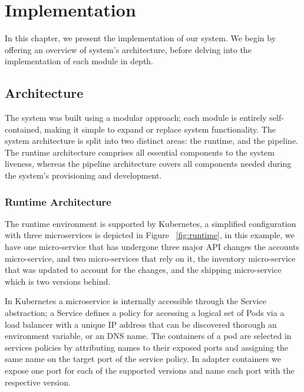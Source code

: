 
%

\chapter{Implementation}
\label{cha:implementation}

In this chapter, we present the implementation of our system.
We begin by offering an overview of system's architecture,
before delving into the implementation of each module in depth.

\section{Architecture} %
\label{sec:architecture}


The system was built using a modular approach;
each module is entirely self-contained, making it simple to expand or replace system functionality.
The system architecture is split into two distinct areas: the runtime, and the pipeline.
The runtime architecture comprises all essential components to the system liveness,
whereas the pipeline architecture covers all components needed during the system's provisioning and development.

\subsection{Runtime Architecture} %
\label{sec:runtime_architecture}

The runtime environment is supported by Kubernetes,
a simplified configuration with three microservices is depicted in Figure ~\ref{fig:runtime},
in this example, we have one micro-service that has undergone three major API changes the accounts micro-service, and
two micro-services that rely on it, the inventory micro-service that was updated to account for the changes, and the shipping micro-service which is two versions behind.

In Kubernetes a microservice is internally accessible through the Service abstraction;
a Service defines a policy for accessing a logical set of Pods via a load balancer with a
unique IP address that can be discovered thorough an environment variable, or an DNS name.
The containers of a pod are selected in services policies by attributing names to their exposed ports and assigning the same name on the target port of the service policy.
In adapter containers we expose one port for each of the supported versions and name each port with the respective version.

